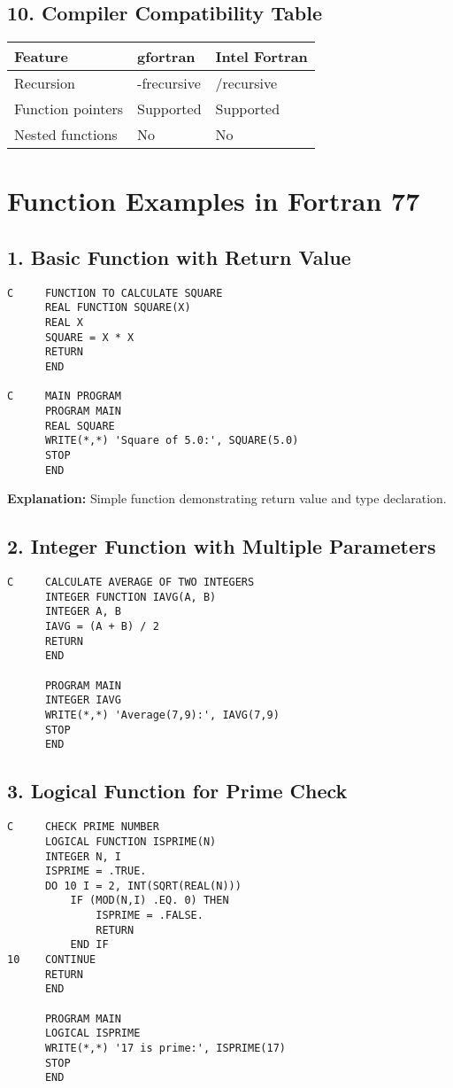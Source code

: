 \documentclass{book}
\begin{document}
\subsection*{10. Compiler Compatibility Table}
\begin{center}
\begin{tabular}{|l|l|l|}
\hline
\textbf{Feature} & \textbf{gfortran} & \textbf{Intel Fortran} \\ 
\hline
Recursion & -frecursive & /recursive \\
Function pointers & Supported & Supported \\
Nested functions & No & No \\
\hline
\end{tabular}
\end{center}

\section{Function Examples in Fortran 77}

\subsection*{1. Basic Function with Return Value}
\begin{verbatim}
C     FUNCTION TO CALCULATE SQUARE
      REAL FUNCTION SQUARE(X)
      REAL X
      SQUARE = X * X
      RETURN
      END

C     MAIN PROGRAM
      PROGRAM MAIN
      REAL SQUARE
      WRITE(*,*) 'Square of 5.0:', SQUARE(5.0)
      STOP
      END
\end{verbatim}
\textbf{Explanation:} Simple function demonstrating return value and type declaration.

\subsection*{2. Integer Function with Multiple Parameters}
\begin{verbatim}
C     CALCULATE AVERAGE OF TWO INTEGERS
      INTEGER FUNCTION IAVG(A, B)
      INTEGER A, B
      IAVG = (A + B) / 2
      RETURN
      END

      PROGRAM MAIN
      INTEGER IAVG
      WRITE(*,*) 'Average(7,9):', IAVG(7,9)
      STOP
      END
\end{verbatim}

\subsection*{3. Logical Function for Prime Check}
\begin{verbatim}
C     CHECK PRIME NUMBER
      LOGICAL FUNCTION ISPRIME(N)
      INTEGER N, I
      ISPRIME = .TRUE.
      DO 10 I = 2, INT(SQRT(REAL(N)))
          IF (MOD(N,I) .EQ. 0) THEN
              ISPRIME = .FALSE.
              RETURN
          END IF
10    CONTINUE
      RETURN
      END

      PROGRAM MAIN
      LOGICAL ISPRIME
      WRITE(*,*) '17 is prime:', ISPRIME(17)
      STOP
      END
\end{verbatim}
\end{document}
